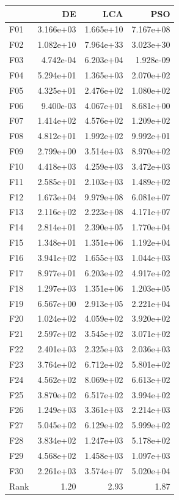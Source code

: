 \begin{tabular}{lrrr}
\toprule
 & DE & LCA & PSO \\
\midrule
F01 & 3.166e+03 & 1.665e+10 & 7.167e+08 \\
F02 & 1.082e+10 & 7.964e+33 & 3.023e+30 \\
F03 & 4.742e-04 & 6.203e+04 & 1.928e-09 \\
F04 & 5.294e+01 & 1.365e+03 & 2.070e+02 \\
F05 & 4.325e+01 & 2.476e+02 & 1.080e+02 \\
F06 & 9.400e-03 & 4.067e+01 & 8.681e+00 \\
F07 & 1.414e+02 & 4.576e+02 & 1.209e+02 \\
F08 & 4.812e+01 & 1.992e+02 & 9.992e+01 \\
F09 & 2.799e+00 & 3.514e+03 & 8.970e+02 \\
F10 & 4.418e+03 & 4.259e+03 & 3.472e+03 \\
F11 & 2.585e+01 & 2.103e+03 & 1.489e+02 \\
F12 & 1.673e+04 & 9.979e+08 & 6.081e+07 \\
F13 & 2.116e+02 & 2.223e+08 & 4.171e+07 \\
F14 & 2.814e+01 & 2.390e+05 & 1.770e+04 \\
F15 & 1.348e+01 & 1.351e+06 & 1.192e+04 \\
F16 & 3.941e+02 & 1.655e+03 & 1.044e+03 \\
F17 & 8.977e+01 & 6.203e+02 & 4.917e+02 \\
F18 & 1.297e+03 & 1.351e+06 & 1.203e+05 \\
F19 & 6.567e+00 & 2.913e+05 & 2.221e+04 \\
F20 & 1.024e+02 & 4.059e+02 & 3.920e+02 \\
F21 & 2.597e+02 & 3.545e+02 & 3.071e+02 \\
F22 & 2.401e+03 & 2.325e+03 & 2.036e+03 \\
F23 & 3.764e+02 & 6.712e+02 & 5.801e+02 \\
F24 & 4.562e+02 & 8.069e+02 & 6.613e+02 \\
F25 & 3.870e+02 & 6.517e+02 & 3.994e+02 \\
F26 & 1.249e+03 & 3.361e+03 & 2.214e+03 \\
F27 & 5.045e+02 & 6.129e+02 & 5.999e+02 \\
F28 & 3.834e+02 & 1.247e+03 & 5.178e+02 \\
F29 & 4.568e+02 & 1.458e+03 & 1.097e+03 \\
F30 & 2.261e+03 & 3.574e+07 & 5.020e+04 \\
\midrule
Rank & 1.20 & 2.93 & 1.87 \\
\bottomrule
\end{tabular}
